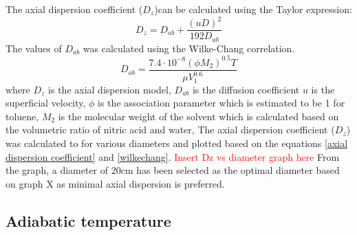 The axial dispersion coefficient ($D_z$)can be calculated using the Taylor expression: 
\begin{equation}
    D_z=D_{ab}+\frac{(uD)^2}{192D_{ab}}
    \label{axial dispersion coefficient}
\end{equation}
The values of $D_{ab}$ was calculated using the Wilke-Chang correlation.
\begin{equation}
    D_{ab}=\frac{7.4\cdot 10^{-8}(\phi M_2)^{0.5}T}{\mu V_1^{0.6}}
    \label{wilkechang}
\end{equation}
where $D_z$ is the axial dispersion model, $D_{ab}$ is the diffusion coefficient $u$ is the superficial velocity, $\phi$ is the association parameter which is estimated to be 1 for toluene, $M_2$ is the molecular weight of the solvent which is calculated based on the volumetric ratio of nitric acid and water, 
The axial dispersion coefficient ($D_z$) was calculated to for various diameters and plotted based on the equations \ref{axial dispersion coefficient} and \ref{wilkechang}.
\textcolor{red}{Insert Dz vs diameter graph here} 
From the graph, a diameter of 20cm has been selected as the optimal diameter based on graph X as minimal axial dispersion is preferred. 
\subsection{Adiabatic temperature}